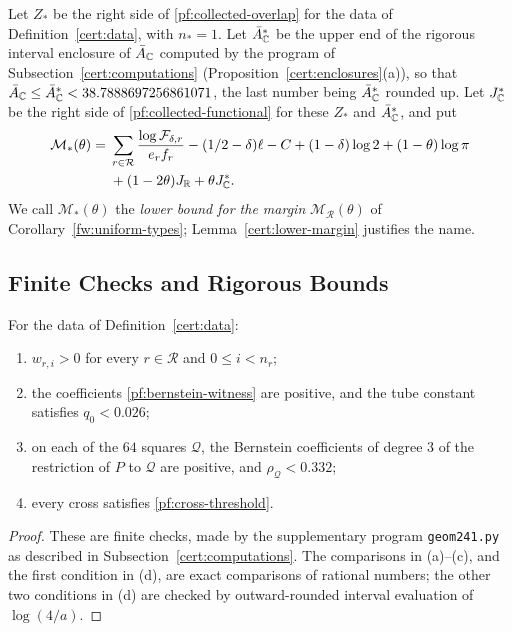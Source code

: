 \begin{definition}\label{cert:lower-bounds}
Let $Z_*$ be the right side of \eqref{pf:collected-overlap} for the data
of Definition~\ref{cert:data}, with $n_*=1$. Let $\bar A_\mathbb C^*$ be the
upper end of the rigorous interval enclosure of $\bar A_\mathbb C$ computed by
the program of Subsection~\ref{cert:computations}
(Proposition~\ref{cert:enclosures}(a)), so that
$\bar A_\mathbb C\le\bar A_\mathbb C^*<38.7888697256861071$, the last number being
$\bar A_\mathbb C^*$ rounded up. Let
$J_\mathbb C^*$ be the right side of \eqref{pf:collected-functional} for these
$Z_*$ and $\bar A_\mathbb C^*$, and put
\[
 \begin{split}
 \mathcal M_*(\theta)={}&\sum_{r\in\mathcal R}
 \frac{\log\mathcal F_{\delta,r}}{e_rf_r}
 -(1/2-\delta)\ell-C+(1-\delta)\log2+(1-\theta)\log\pi\\
 &+(1-2\theta)J_\mathbb R+\theta J_\mathbb C^* .
 \end{split}
\]
We call $\mathcal M_*(\theta)$ the \emph{lower bound for the margin}
$\mathcal M_{\mathcal R}(\theta)$ of Corollary~\ref{fw:uniform-types};
Lemma~\ref{cert:lower-margin} justifies the name.
\end{definition}

\subsection{Finite Checks and Rigorous Bounds}

\begin{proposition}\label{cert:exact}
For the data of Definition~\ref{cert:data}:
\begin{enumerate}
\item[(a)] $w_{r,i}>0$ for every $r\in\mathcal R$ and $0\le i<n_r$;
\item[(b)] the coefficients \eqref{pf:bernstein-witness} are positive,
and the tube constant satisfies $q_0<0.026$;
\item[(c)] on each of the $64$ squares $\mathcal Q$, the Bernstein
coefficients of degree $3$ of the restriction of $P$ to $\mathcal Q$ are
positive, and $\rho_{\mathcal Q}<0.332$;
\item[(d)] every cross satisfies \eqref{pf:cross-threshold}.
\end{enumerate}
\end{proposition}

\begin{proof}
These are finite checks, made by the supplementary program
\texttt{geom241.py} as described in Subsection~\ref{cert:computations}.
The comparisons in (a)--(c), and the first condition in (d), are exact
comparisons of rational numbers; the other two conditions in (d) are
checked by outward-rounded interval evaluation of $\log(4/a)$.
\end{proof}

